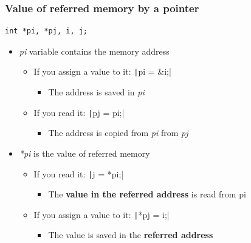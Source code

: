 \documentclass{../c-lecture}
\begin{document}
\begin{frame}[fragile]
  \frametitle{Value of referred memory by a pointer}
  \begin{verbatim}
int *pi, *pj, i, j;
  \end{verbatim}
  \begin{itemize}
    \item
      \textit{\color{YellowOrange} pi} variable contains the memory address
    \begin{itemize}
      \item
        If you assign a value to it:
        \texttt|pi = &i;|
      \begin{itemize}
        \item The address is saved in \textit{\color{Cyan} pi}
      \end{itemize}
      \item If you read it: \texttt|pj = pi;|
      \begin{itemize}
        \item
          The address is copied from \textit{\color{Cyan} pi} from
          \textit{\color{LimeGreen} pj}
      \end{itemize}
    \end{itemize}
  \end{itemize}
\end{frame}

\begin{frame}
  \begin{itemize}
    \item
      \textit{\color{YellowOrange} *pi} is the value of referred memory

    \begin{itemize}
      \item If you read it: \texttt|j = *pi;|
      \begin{itemize}
        \item
          The \textbf{\color{Cyan} value in the referred address} is
          read from pi

      \end{itemize}
      \item
        If you assign a value to it: \texttt|*pj = i;|

      \begin{itemize}
        \item
          The value is saved in the
          \textbf{\color{Cyan} referred address}
      \end{itemize}
    \end{itemize}
  \end{itemize}
\end{frame}
\end{document}
